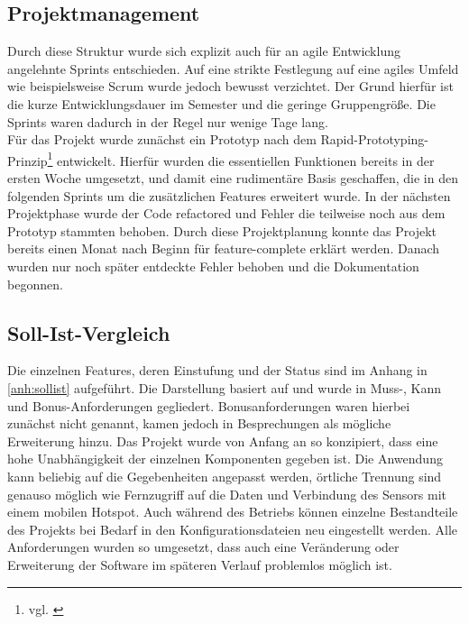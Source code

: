 \subsection{Projektmanagement}
Durch diese Struktur wurde sich explizit auch für an agile Entwicklung angelehnte Sprints entschieden.
Auf eine strikte Festlegung auf eine agiles Umfeld wie beispielsweise Scrum wurde jedoch bewusst verzichtet.
Der Grund hierfür ist die kurze Entwicklungsdauer im Semester und die geringe Gruppengröße.
Die Sprints waren dadurch in der Regel nur wenige Tage lang. \\
Für das Projekt wurde zunächst ein Prototyp nach dem Rapid-Prototyping-Prinzip\footnote{vgl. \cite{krypczyk.2019}} entwickelt.
Hierfür wurden die essentiellen Funktionen bereits in der ersten Woche umgesetzt, und damit eine rudimentäre Basis geschaffen, die in den folgenden Sprints um die zusätzlichen Features erweitert wurde.
In der nächsten Projektphase wurde der Code refactored und Fehler die teilweise noch aus dem Prototyp stammten behoben.
Durch diese Projektplanung konnte das Projekt bereits einen Monat nach Beginn für feature-complete erklärt werden.
Danach wurden nur noch später entdeckte Fehler behoben und die Dokumentation begonnen.

\subsection{Soll-Ist-Vergleich}
Die einzelnen Features, deren Einstufung und der Status sind im Anhang in \autoref{anh:sollist} aufgeführt.
Die Darstellung basiert auf \cite{Wortmann.2020} und wurde in Muss-, Kann und Bonus-Anforderungen gegliedert. Bonusanforderungen waren hierbei zunächst nicht genannt, kamen jedoch in Besprechungen als mögliche Erweiterung hinzu.
Das Projekt wurde von Anfang an so konzipiert, dass eine hohe Unabhängigkeit der einzelnen Komponenten gegeben ist.
Die Anwendung kann beliebig auf die Gegebenheiten angepasst werden, örtliche Trennung sind genauso möglich wie Fernzugriff auf die Daten und Verbindung des Sensors mit einem mobilen Hotspot.
Auch während des Betriebs können einzelne Bestandteile des Projekts bei Bedarf in den Konfigurationsdateien neu eingestellt werden.
Alle Anforderungen wurden so umgesetzt, dass auch eine Veränderung oder Erweiterung der Software im späteren Verlauf problemlos möglich ist. 